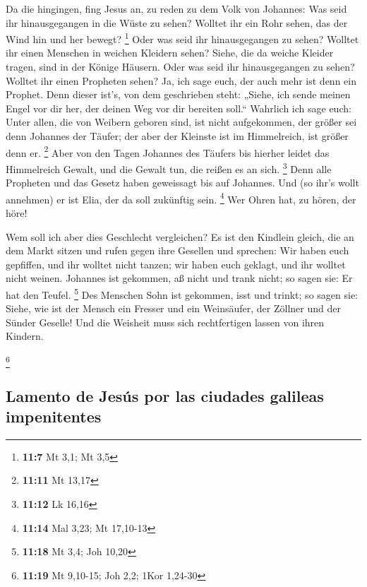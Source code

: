  Da die hingingen, fing Jesus an, zu reden zu dem Volk von
Johannes: Was seid ihr hinausgegangen in die Wüste zu sehen? Wolltet ihr
ein Rohr sehen, das der Wind hin und her bewegt? \footnote{\textbf{11:7}
  Mt 3,1; Mt 3,5}  Oder was seid ihr hinausgegangen zu
sehen? Wolltet ihr einen Menschen in weichen Kleidern sehen? Siehe, die
da weiche Kleider tragen, sind in der Könige Häusern. 
Oder was seid ihr hinausgegangen zu sehen? Wolltet ihr einen Propheten
sehen? Ja, ich sage euch, der auch mehr ist denn ein Prophet.
 Denn dieser ist's, von dem geschrieben steht: „Siehe,
ich sende meinen Engel vor dir her, der deinen Weg vor dir bereiten
soll.``  Wahrlich ich sage euch: Unter allen, die von
Weibern geboren sind, ist nicht aufgekommen, der größer sei denn
Johannes der Täufer; der aber der Kleinste ist im Himmelreich, ist
größer denn er. \footnote{\textbf{11:11} Mt 13,17}  Aber
von den Tagen Johannes des Täufers bis hierher leidet das Himmelreich
Gewalt, und die Gewalt tun, die reißen es an sich. \footnote{\textbf{11:12}
  Lk 16,16}  Denn alle Propheten und das Gesetz haben
geweissagt bis auf Johannes.  Und (so ihr's wollt
annehmen) er ist Elia, der da soll zukünftig sein. \footnote{\textbf{11:14}
  Mal 3,23; Mt 17,10-13}  Wer Ohren hat, zu hören, der
höre!

 Wem soll ich aber dies Geschlecht vergleichen? Es ist
den Kindlein gleich, die an dem Markt sitzen und rufen gegen ihre
Gesellen  und sprechen: Wir haben euch gepfiffen, und ihr
wolltet nicht tanzen; wir haben euch geklagt, und ihr wolltet nicht
weinen.  Johannes ist gekommen, aß nicht und trank nicht;
so sagen sie: Er hat den Teufel. \footnote{\textbf{11:18} Mt 3,4; Joh
  10,20}  Des Menschen Sohn ist gekommen, isst und
trinkt; so sagen sie: Siehe, wie ist der Mensch ein Fresser und ein
Weinsäufer, der Zöllner und der Sünder Geselle! Und die Weisheit muss
sich rechtfertigen lassen von ihren Kindern.

\footnote{\textbf{11:19} Mt 9,10-15; Joh 2,2; 1Kor 1,24-30}

\hypertarget{lamento-de-jesuxfas-por-las-ciudades-galileas-impenitentes}{%
\subsection{Lamento de Jesús por las ciudades galileas
impenitentes}\label{lamento-de-jesuxfas-por-las-ciudades-galileas-impenitentes}}

